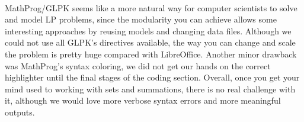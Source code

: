 \paragraph{}
MathProg/GLPK seems like a more natural way for computer scientists to solve and model LP problems, since the modularity you can achieve allows some interesting approaches by reusing models and changing data files. Although we could not use all GLPK's directives available, the way you can change and scale the problem is pretty huge compared with LibreOffice. Another minor drawback was MathProg's syntax coloring, we did not get our hands on the correct highlighter until the final stages of the coding section. Overall, once you get your mind used to working with sets and summations, there is no real challenge with it, although we would love more verbose syntax errors and more meaningful outputs.  